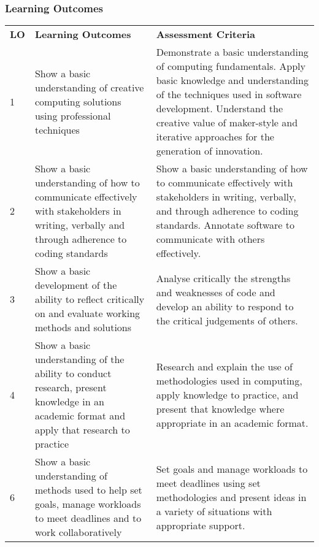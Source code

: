 \documentclass[handout, xcolor={dvipsnames}]{beamer}\usepackage{etoolbox}\newtoggle{printable}\toggletrue{printable}
\begin{document}
\begin{frame}
	\frametitle{Learning Outcomes}
	
	\centering
		\tiny
		\def\arraystretch{1.5}
		\begin{tabular} { | p{} | p{} p{} |}
 			\textbf{LO} &
			\textbf{Learning Outcomes} &  
			\textbf{Assessment Criteria} \\

 			1 &
			Show a basic understanding of creative computing solutions using professional techniques  &  
			Demonstrate a basic understanding of computing fundamentals. Apply basic knowledge and understanding of the techniques used in software development. Understand the creative value of maker-style and iterative approaches for the generation of innovation. \\
 			2 &
			Show a basic understanding of how to communicate effectively with stakeholders in writing, verbally and through adherence to coding standards &  
			Show a basic understanding of how to communicate effectively with stakeholders in writing, verbally, and through adherence to coding standards. Annotate software to communicate with others effectively. \\
 			3 &
			Show a basic development of the ability to reflect critically on and evaluate working methods and solutions  & 
			Analyse critically the strengths and weaknesses of code and develop an ability to respond to the critical judgements of others. \\
 			4 &
			Show a basic understanding of the ability to conduct research, present knowledge in an academic format and apply that research to practice  & 
			Research and explain the use of methodologies used in computing, apply knowledge to practice, and present that knowledge where appropriate in an academic format. \\
 			6 &
			Show a basic understanding of methods used to help set goals, manage workloads to meet deadlines and to work collaboratively  & 
			Set goals and manage workloads to meet deadlines using set methodologies and present ideas in a variety of situations with appropriate support. 
		\end{tabular}
	
\end{frame}
\end{document}
